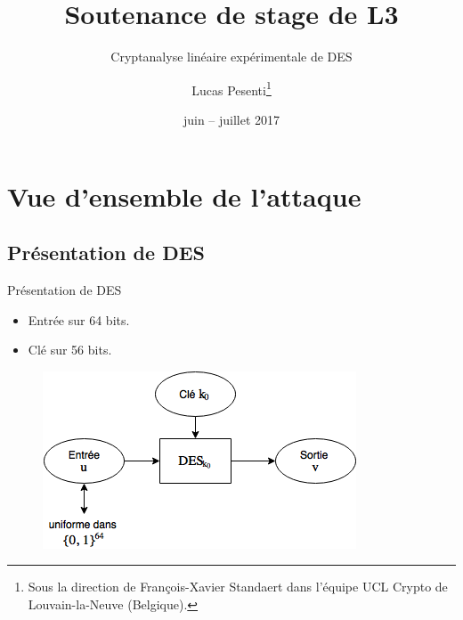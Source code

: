 \documentclass{beamer}
\title{Soutenance de stage de L3}
\subtitle{Cryptanalyse linéaire expérimentale de DES}
\author{Lucas Pesenti\thanks{Sous la direction de François-Xavier Standaert dans l'équipe UCL Crypto de Louvain-la-Neuve (Belgique).}}
\date{juin -- juillet 2017}
\begin{document}
\begin{frame}
	\maketitle
\end{frame}

\begin{frame}
	\tableofcontents
\end{frame}

\section{Vue d'ensemble de l'attaque}
\begin{frame}
	\tableofcontents[currentsection]
\end{frame}

\subsection{Présentation de DES}
\begin{frame}{Présentation de DES}
	\begin{itemize}
		\item Entrée sur 64 bits.
		\item Clé sur 56 bits.
	\end{itemize}

	\begin{figure}
		\centering
		\includegraphics[scale=0.8]{descheme}
	\end{figure}
\end{frame}
\end{document}
